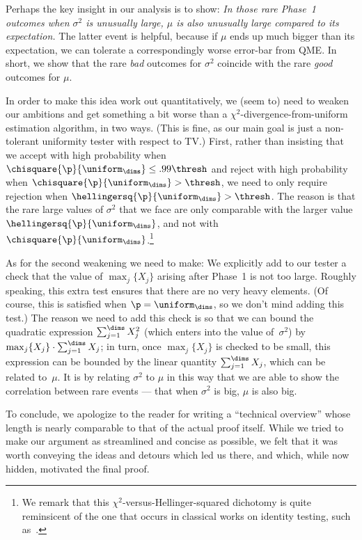 \documentclass[11pt]{article}
\begin{document}
Perhaps the key insight in our analysis is to show: \emph{In those rare Phase~1 outcomes when $\sigma^2$ is unusually large, $\mu$ is \emph{also} unusually large compared to its expectation.}  The latter event is helpful, because if $\mu$ ends up much bigger than its expectation, we can tolerate a correspondingly worse error-bar from QME.  In short, we show that the rare \emph{bad} outcomes for $\sigma^2$ coincide with the rare \emph{good} outcomes for $\mu$. 

In order to make this idea work out quantitatively, we (seem to) need to weaken our ambitions and get something a bit worse than a $\chi^2$-divergence-from-uniform estimation algorithm, in two ways. (This is fine, as our main goal is just a non-tolerant uniformity tester with respect to TV.)  
First, rather than insisting that we accept with high probability when $\chisquare{\p}{\uniform_\dims} \leq .99 \thresh$ and reject with high probability when $\chisquare{\p}{\uniform_\dims} > \thresh$, we need to only require rejection when $\hellingersq{\p}{\uniform_\dims} > \thresh$.
The reason is that the rare large values of $\sigma^2$ that we face are only comparable with the larger value $\hellingersq{\p}{\uniform_\dims}$, and not with $\chisquare{\p}{\uniform_\dims}$.\footnote{We remark that this $\chi^2$-versus-Hellinger-squared dichotomy is quite reminsicent of the one that occurs in classical works on identity testing, such as~\cite{AcharyaDK15}.} 

As for the second weakening we need to make:  We explicitly add to our tester a check that the value of $\max_j\{X_j\}$ arising after Phase~1 is not too large.  Roughly speaking, this extra test ensures that there are no very heavy elements.  %
(Of course, this is satisfied when $\p = \uniform_\dims$, so we don't mind adding this test.)
The reason we need to add this check is so that we can bound the quadratic expression $\sum_{j = 1}^\dims X_j^2$ (which enters into the value of~$\sigma^2$) by $\max_j\{X_j\} \cdot \sum_{j=1}^\dims X_j$; in turn, once $\max_j\{X_j\}$ is checked to be small, this expression can be bounded by the linear quantity $\sum_{j=1}^\dims X_j$, which can be related to~$\mu$.
It is by relating $\sigma^2$ to $\mu$ in this way that we are able to show the correlation between rare events --- that when $\sigma^2$ is big, $\mu$ is also big. 

To conclude, we apologize to the reader for writing a ``technical overview'' whose length is nearly comparable to that of the actual proof itself. While we tried to make our argument as streamlined and concise as possible, we felt that it was worth conveying the ideas and detours which led us there, and which, while now hidden, motivated the final proof.
\end{document}
